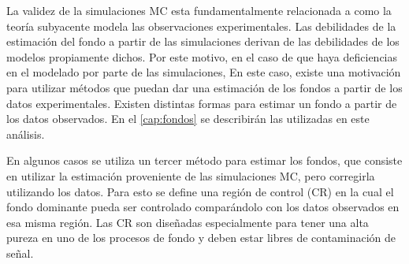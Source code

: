





La validez de la simulaciones MC esta fundamentalmente relacionada a como la
teoría subyacente modela las observaciones experimentales. Las debilidades de
la estimación del fondo a partir de las simulaciones derivan de las
debilidades de los modelos propiamente dichos.
Por este motivo, en el caso
de que haya deficiencias en el modelado por parte de las simulaciones,
En este caso, existe
una motivación para utilizar métodos que puedan dar una estimación de los fondos
a partir de los datos experimentales. Existen distintas formas para estimar un
fondo a partir de los datos observados. En el \cref{cap:fondos} se
describirán las utilizadas en este análisis.

En algunos casos se utiliza un tercer método para estimar los fondos, que consiste en
utilizar la estimación proveniente de las simulaciones MC, pero corregirla
utilizando los datos. Para esto se define una región de control (CR) en
la cual el fondo dominante pueda ser controlado comparándolo con los datos
observados en esa misma región. Las CR son diseñadas especialmente para tener
una alta pureza en uno de los procesos de fondo y deben estar libres de
contaminación de señal.

